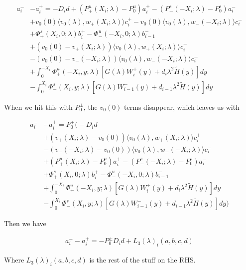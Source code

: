 \documentclass[12pt]{article}
\begin{document}
\begin{enumerate}
\begin{align*}
a_i^- &- a_i^+ = -D_i d + (P^u_+(X_i; \lambda) - P_0^u)a_i^+ - (P^s_-(-X_i; \lambda) - P_0^s)a_i^- \\
&+ v_0(0) \langle v_0(\lambda), w_+(X_i; \lambda) \rangle c_i^+ 
- v_0(0) \langle v_0(\lambda), w_-(-X_i; \lambda) \rangle c_i^- \\
&+ \Phi^s_+(X_i, 0; \lambda)b_i^+ - \Phi^u_-(-X_i, 0; \lambda)b_{i-1}^- \\
&+ (v_0(0) - v_+(X_i; \lambda)) \langle v_0(\lambda), w_+(X_i; \lambda) \rangle c_i^+ \\
&- (v_0(0) - v_-(-X_i; \lambda)) \langle v_0(\lambda), w_-(-X_i; \lambda) \rangle c_i^- \\
&+ \int_0^{-X_i} \Phi^u_+(-X_i, y; \lambda) [ G(\lambda)W_i^+(y) + d_i \lambda^2 \tilde{H}(y) ] dy \\
&- \int_0^{X_i} \Phi^s_-(X_i, y; \lambda) [ G(\lambda)W_{i-1}^-(y) + d_{i-1} \lambda^2 \tilde{H}(y) ] dy  
\end{align*}

When we hit this with $P_0^\pm$, the $v_0(0)$ terms disappear, which leaves us with

\begin{align*}
a_i^- &- a_i^+ = P_0^\pm \Big(-D_i d \\
&+(v_+(X_i; \lambda) - v_0(0)) \langle v_0(\lambda), w_+(X_i; \lambda) \rangle c_i^+ \\
&- (v_-(-X_i; \lambda) - v_0(0)) \langle v_0(\lambda), w_-(-X_i; \lambda) \rangle c_i^- \\
&+ (P^u_+(X_i; \lambda) - P_0^u)a_i^+ - (P^s_-(-X_i; \lambda) - P_0^s)a_i^- \\
&+ \Phi^s_+(X_i, 0; \lambda)b_i^+ - \Phi^u_-(-X_i, 0; \lambda)b_{i-1}^- \\
&+ \int_0^{-X_i} \Phi^u_+(-X_i, y; \lambda) [ G(\lambda)W_i^+(y) + d_i \lambda^2 \tilde{H}(y) ] dy \\
&- \int_0^{X_i} \Phi^s_-(X_i, y; \lambda) [ G(\lambda)W_{i-1}^-(y) + d_{i-1} \lambda^2 \tilde{H}(y) ] dy \Big)
\end{align*}

Then we have

\begin{align*}
a_i^- - a_i^+ = -P_0^\pm D_i d + L_3(\lambda)_i(a, b, c, d)
\end{align*}

Where $L_3(\lambda)_i(a, b, c, d)$ is the rest of the stuff on the RHS.


\end{enumerate}
\end{document}
